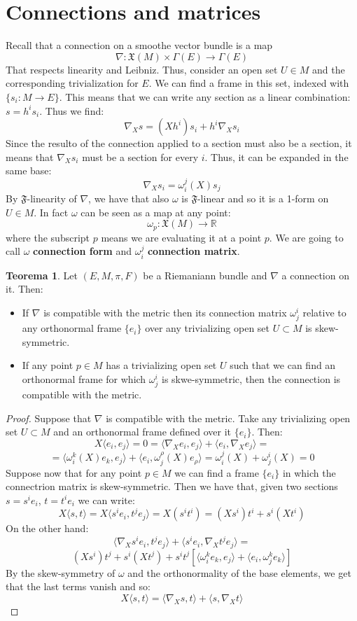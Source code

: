 \documentclass[12pt,a4paper]{report}
\theoremstyle{definition}
\theoremstyle{Theorem}
\newtheorem{Theo}[Def]{Teorema}
\theoremstyle{definition}
\theoremstyle{definition}
\theoremstyle{definition}
\begin{document}
	\section{Connections and matrices}
	Recall that a connection on a smoothe vector bundle is a map
	$$\nabla:\mathfrak{X}(M)\times \Gamma(E)\rightarrow\Gamma(E)$$
	That respects linearity and Leibniz. Thus, consider an open set $U\in M$ and the corresponding trivialization for $E$. We can find a frame in this set, indexed with $\{s_i:M\rightarrow E\}$. This means that we can write any section as a linear combination:
	$s=h^is_i$. Thus we find:
	$$\nabla_Xs=(Xh^i)s_i+h^i\nabla_Xs_i$$
	Since the resulto of the connection applied to a section must also be a section, it means that $\nabla_Xs_i$ must be a section for every $i$. Thus, it can be expanded in the same base:
	$$\nabla_X s_i=\omega_i^j(X)s_j$$
	By $\mathfrak{F}$-linearity of $\nabla$, we have that also $\omega$ is $\mathfrak{F}$-linear and so it is a 1-form on $U\in M$. In fact $\omega$ can be seen as a map at any point:
	$$\omega_p:\mathfrak{X}(M)\rightarrow\mathbb{R}$$ 
	where the subscript $p$ means we are evaluating it at a point $p$.
	We are going to call $\omega$ \textbf{connection form} and $\omega^j_i$ \textbf{connection matrix}.
	\begin{Theo}
		Let $(E,M,\pi,F)$ be a Riemaniann bundle and $\nabla$ a connection on it. Then:
		\begin{itemize}
			\item If $\nabla$ is compatible with the metric then its connection matrix $\omega^i_j$ relative to any orthonormal frame $\{e_i\}$ over any trivializing open set $U\subset M$ is skew-symmetric.
			\item If any point $p\in M$ has a trivializing open set $U$ such that we can find an orthonormal frame for which $\omega^i_j$ is skwe-symmetric, then the connection is compatible with the metric.
		\end{itemize}
	\end{Theo}
	\begin{proof}
		Suppose that $\nabla$ is compatible with the metric. Take any trivializing open set $U\subset M$ and an orthonormal frame  defined over it $\{e_i\}$. Then:
		$$X\langle e_i,e_j\rangle=0=\langle\nabla_X e_i,e_j\rangle+\langle e_i,\nabla_Xe_j\rangle=$$
		$$=\langle\omega^k_i(X)e_k,e_j\rangle+\langle e_i,\omega^\rho_j(X)e_\rho\rangle=\omega^j_i(X)+\omega^i_j(X)=0$$
		Suppose now that for any point $p\in M$ we can find a frame $\{e_i\}$ in which the connectrion matrix is skew-symmetric. Then we have that, given two sections $s=s^ie_i$, $t=t^ie_i$ we can write:
		$$X\langle s,t\rangle=X\langle s^ie_i,t^je_j\rangle=X(s^it^i)=(Xs^i)t^i+s^i(Xt^i)$$
		On the other hand:
		$$\langle \nabla_Xs^ie_i,t^je_j\rangle+\langle s^ie_i,\nabla_Xt^je_j\rangle=$$
		$$(Xs^i)t^j+s^i(Xt^j)+s^it^j[\langle \omega^k_ie_k,e_j\rangle+\langle e_i,\omega^k_je_k\rangle]$$
		By the skew-symmetry of $\omega$ and the orthonormality of the base elements, we get that the last terms vanish and so:
		$$X\langle s,t\rangle=\langle\nabla_Xs,t\rangle+\langle s,\nabla_Xt\rangle$$
	\end{proof}
\end{document}
